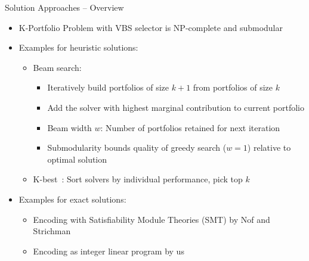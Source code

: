 \documentclass[en]{sdqbeamer}
\begin{document}
\begin{frame}[t]{Solution Approaches -- Overview}
	\begin{itemize}
		\item K-Portfolio Problem with VBS selector is NP-complete and submodular~\cite{nof2020real}
		\pause
		\vspace{\baselineskip}
		\item Examples for heuristic solutions:
		\begin{itemize}
			\item Beam search:
			\begin{itemize}
				\item Iteratively build portfolios of size $k+1$ from portfolios of size $k$
				\item Add the solver with highest marginal contribution to current portfolio
				\item Beam width $w$: Number of portfolios retained for next iteration
				\pause
				\item Submodularity bounds quality of greedy search ($w=1$) relative to optimal solution~\cite{nemhauser1978analysis, nof2020real}
			\end{itemize}
			\pause
			\item K-best~\cite{nof2020real}: Sort solvers by individual performance, pick top $k$
		\end{itemize}
		\pause
		\vspace{\baselineskip}
		\item Examples for exact solutions:
		\begin{itemize}
			\item Encoding with Satisfiability Module Theories (SMT) by Nof and Strichman~\cite{nof2020real}
			\pause
			\item Encoding as integer linear program by us
		\end{itemize}
	\end{itemize}
\end{frame}
\end{document}
